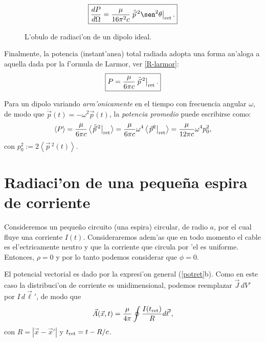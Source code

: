 \begin{equation}
\boxed{\frac{dP}{d\Omega}%
=\frac{\mu}{16\pi^2 c}\left.{\ddot{\vec{p}}{\,}^2}\sen^2\theta\right|_{\rm ret}.}
\end{equation}
\begin{figure}[H]
\centerline{}
 \caption{L'obulo de radiaci'on de un dipolo ideal.}
\label{fig-dipolo}
\end{figure}
Finalmente, la potencia (instant'anea) total radiada adopta una forma an'aloga a aquella dada por la f'ormula de Larmor, ver \eqref{R-larmor}:
\begin{equation}\label{PotdH}
\boxed{P=\frac{\mu}{6\pi c}\left.\ddot{\vec{p}}{\,}^2\right|_{\rm ret}.}
\end{equation}

Para un dipolo variando \textit{arm'onicamente} en el tiempo con frecuencia angular $\omega$, de modo que $\ddot{\vec{p}}(t)=-\omega^2\vec{p}(t)$, la \textit{potencia promedio} puede escribirse como:
\begin{equation}
\left\langle P\right\rangle
=\frac{\mu}{6\pi c}\left\langle\left.\ddot{\vec{p}}{\,}^2\right|_{\rm ret}\right\rangle 
=\frac{\mu}{6\pi c}\omega^4\left\langle\left.\vec{p}^2\right|_{\rm ret}\right\rangle
=\frac{\mu}{12\pi c}\omega^4 p_0^2,
\end{equation}
con $p_0^2:=2\left\langle \vec{p}{\,}^2(t)\right\rangle$.


\section{Radiaci'on de una peque\~na espira de corriente}

Consideremos un peque\~no circuito (una espira) circular, de radio $a$, por el cual fluye una corriente $I(t)$. Consideraremos adem'as que en todo momento  el cable es el'ectricamente neutro y que la corriente que circula por 'el es uniforme. Entonces, $\rho=0$ y por lo tanto podemos considerar que $\phi=0$.

El potencial vectorial es dado por la expresi'on general (\ref{potret}b). Como en este caso la distribuci'on de corriente es unidimensional, podemos reemplazar $\vec{J}\,dV'$ por $I\,d\vec{\ell} '$, de modo que
\begin{equation}
 \vec{A}(\vec{x},t)=\frac{\mu}{4\pi}\oint \frac{I(t_{\rm ret})}{R}d\vec{\ell} ' , \label{Aloop1}
\end{equation}
con $R=|\vec{x}-\vec{x}'|$ y $t_{\rm ret}=t-R/c$.

